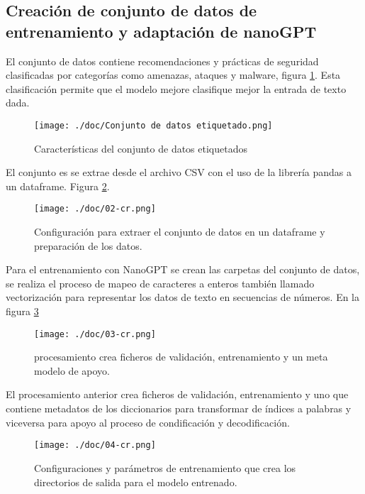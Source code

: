 
\subsection{Creación de conjunto de datos de entrenamiento y adaptación de nanoGPT}\label{section:Creación de conjunto de datos con fuentes de internet} 
El conjunto de datos contiene recomendaciones y prácticas de seguridad clasificadas por categorías como amenazas, ataques y malware, figura \ref{figure:Conjunto de datos}. Esta clasificación permite que el modelo mejore clasifique mejor la entrada de texto dada.
\begin{figure}[H]
   \centering %
       \texttt{[image: ./doc/Conjunto de datos etiquetado.png]} 
   \caption{Características del conjunto de datos etiquetados \cite{}}
  \label{figure:Conjunto de datos}  %
\end{figure}
El conjunto es se extrae desde el archivo CSV con el uso de la librería pandas a un dataframe. Figura \ref{figure:Extraxión de datos del csv}.\cite{Reiss2021}
\begin{figure}[H]
   \centering %
       \texttt{[image: ./doc/02-cr.png]} 
   \caption{Configuración para extraer el conjunto de datos en un dataframe y preparación de los datos.  \cite{}}
  \label{figure:Extraxión de datos del csv}  %
\end{figure}
Para el entrenamiento con NanoGPT se crean las carpetas del conjunto de datos, se realiza el proceso de mapeo de caracteres a enteros también llamado vectorización para representar los datos de texto en secuencias de números. \cite{GenerGediz2020}
En la figura \ref{figure:Etapa de encoder}
\begin{figure}[H]
   \centering %
       \texttt{[image: ./doc/03-cr.png]} 
   \caption{procesamiento crea  ficheros de validación, entrenamiento y un meta modelo de apoyo.  \cite{}}
  \label{figure:Etapa de encoder}  %
\end{figure}
El procesamiento anterior crea ficheros de validación, entrenamiento y uno que contiene metadatos de los diccionarios para transformar de índices a palabras y viceversa para apoyo al proceso de condificación y decodificación.
\begin{figure}[H]
   \centering %
       \texttt{[image: ./doc/04-cr.png]} 
   \caption{Configuraciones y parámetros de entrenamiento que crea los directorios de salida para el modelo entrenado.  \cite{}}
  \label{figure:Configuraciónes de parámetros}  %
\end{figure}
\clearpage
